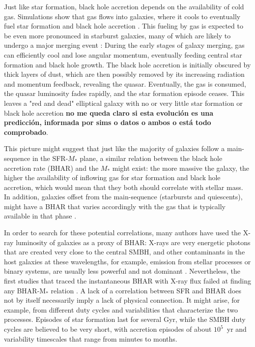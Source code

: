     Just like star formation, black hole accretion depends on the availability of cold gas. Simulations show that gas flows into galaxies, where it cools to eventually fuel star formation and black hole accretion \citep{2010MNRAS.407.1529H}. This fueling by gas is expected to be even more pronounced in starburst galaxies, many of which are likely to undergo a major merging event \citep{2005Natur.433..604D, 2008ApJS..175..356H}: During the early stages of galaxy merging, gas can efficiently cool and lose angular momentum, eventually feeding central star formation and black hole growth. 
    The black hole accretion is initially obscured by thick layers of dust, which are then possibly removed by its increasing radiation and momentum feedback, revealing the quasar. Eventually, the gas is consumed, the quasar luminosity fades rapidly, and the star formation episode ceases. This leaves a "red and dead" elliptical galaxy with no or very little star formation or black hole accretion \citep{2004ApJ...600..580G, 2006ApJ...650...42L}{\bf no me queda claro si esta evolución es una predicción, informada por sims o datos o ambos o está todo comprobado}.
    
    This picture might suggest that just like the majority of galaxies follow a main-sequence in the SFR-$M_*$ plane, a similar relation between the black hole accretion rate (BHAR) and the $M_*$ might exist: the more massive the galaxy, the higher the availability of inflowing gas for star formation and black hole accretion, which would mean that they both should correlate with stellar mass. In addition, galaxies offset from the main-sequence (starbursts and quiescents), might have a BHAR that varies accordingly with the gas that is typically available in that phase \citep{2019ApJ...877L..38R}. 
    
    In order to search for these potential correlations, many authors have used the X-ray luminosity of galaxies as a proxy of BHAR: X-rays are very energetic photons that are created very close to the central SMBH, and other contaminants in the host galaxies at these wavelengths, for example, emission from stellar processes or binary systems, are usually less powerful and not dominant \citep[e.g.][]{2015A&ARv..23....1B}. Nevertheless, the first studies that traced the instantaneous BHAR with X-ray flux failed at finding any BHAR-M$_*$ relation \citep{2009ApJ...696..396S, 2010A&A...518L..26S, 2012MNRAS.419...95M, 2012A&A...545A..45R, 2015ApJ...806..187A}. A lack of a correlation between SFR and BHAR does not by itself necessarily imply a lack of physical connection. It might arise, for example, from different duty cycles and variabilities that characterize the two processes.  
    Episodes of star formation last for several Gyr, while the SMBH duty cycles are believed to be very short, with accretion episodes of about $10^5$~yr and variability timescales that range from minutes to months.
    
